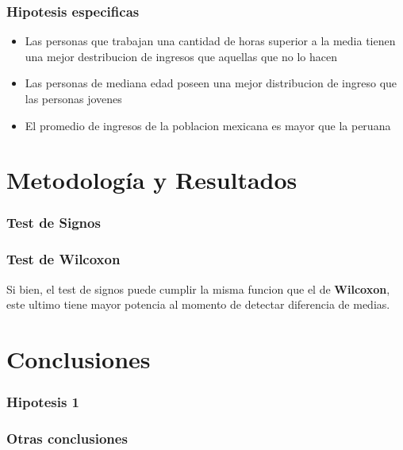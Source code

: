 \documentclass{beamer}
\begin{document}

\begin{frame}
\frametitle{Hipotesis especificas}
  \begin{itemize}
      \item Las personas que trabajan una cantidad de horas superior a
        la media tienen una mejor destribucion de ingresos que aquellas
        que no lo hacen
      \item Las personas de mediana edad poseen una mejor distribucion
        de ingreso que las personas jovenes
      \item El promedio de ingresos de la poblacion mexicana es mayor
        que la peruana
  \end{itemize}

\end{frame}

\section{Metodología y Resultados}



\begin{frame}
  \frametitle{Test de Signos}


\end{frame}

\begin{frame}
  \frametitle{Test de Wilcoxon}

  Si bien, el test de signos puede cumplir la misma funcion que el de
  \textbf{Wilcoxon}, este ultimo tiene mayor potencia al momento de
  detectar diferencia de medias.


\end{frame}



\section{Conclusiones}

\begin{frame}
  \frametitle{Hipotesis 1}
  

\end{frame}


\begin{frame}

  \frametitle{Otras conclusiones}

\end{frame}
\end{document}
